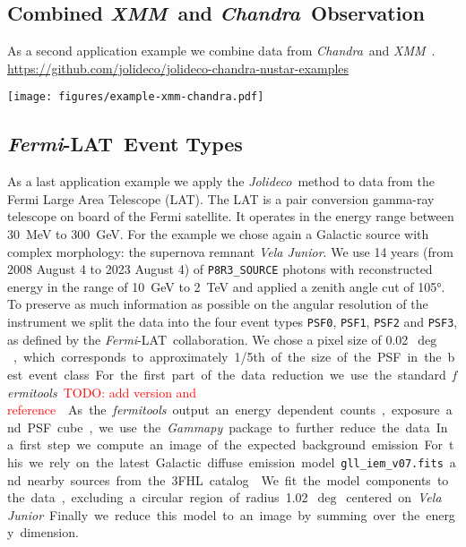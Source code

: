 \documentclass[twocolumn]{aastex631}
\newcommand{\chandra}{\textit{Chandra}~}
\newcommand{\xmm}{\textit{XMM}~}
\newcommand{\fermi}{\textit{Fermi}-LAT~}
\newcommand{\jolideco}{\textit{Jolideco}~}
\newcommand{\todo}[1]{\textcolor{red}{TODO: #1}\PackageWarning{TODO:}{#1!}}
\begin{document}
    \subsection{Combined \xmm and \chandra Observation}
    As a second application example we combine data from \chandra and \xmm.
    \url{https://github.com/jolideco/jolideco-chandra-nustar-examples}
        
    \begin{figure*}
        \begin{centering}
            \texttt{[image: figures/example-xmm-chandra.pdf]}
            \caption{
                Chandra Example
            }
            \label{fig:example-xmm-chandra}
        \end{centering}
    \end{figure*}


    \subsection{\fermi Event Types}
    As a last application example we apply the \jolideco method to data from the Fermi Large Area Telescope (LAT).
    The LAT is a pair conversion gamma-ray telescope on board of the Fermi satellite. It operates in the energy range between \qty[mode = text]{30}{MeV} to  \qty[mode = text]{300}{GeV}. For the example we chose again a Galactic source with complex morphology: the supernova remnant \textit{Vela Junior}. We use 14 years (from 2008 August 4 to 2023 August 4) of \texttt{P8R3\_SOURCE} photons with reconstructed energy in the range of \qty[mode = text]{10}{GeV} to  \qty[mode = text]{2}{TeV} and applied a zenith angle cut of \ang{105}. To preserve as much information as possible on the angular resolution of the instrument we split the data into the four event types \texttt{PSF0}, \texttt{PSF1}, \texttt{PSF2} and \texttt{PSF3}, as
    defined by the \fermi collaboration. We chose a pixel size of \qty[mode = text]{0.02}{$\deg$}, which corresponds to approximately 1/5th of the size of the PSF in the best event class. For the first part of the data reduction we use the standard \textit{fermitools} \todo{add version and reference}.
    
    As the \textit{fermitools} output an energy dependent counts, exposure and PSF cube, we use the \textit{Gammapy} package to further reduce the data. In a first step we compute an image of the expected background emission. For this we rely on the latest Galactic diffuse emission model \texttt{gll\_iem\_v07.fits} and nearby sources from the 3FHL catalog \cite{Ajello2017}. We fit the model components to the data, excluding a circular region of radius \qty[mode = text]{1.02}{$\deg$} centered on \textit{Vela Junior}. Finally we reduce this model to an image by summing over the energy dimension.
    
\end{document}
